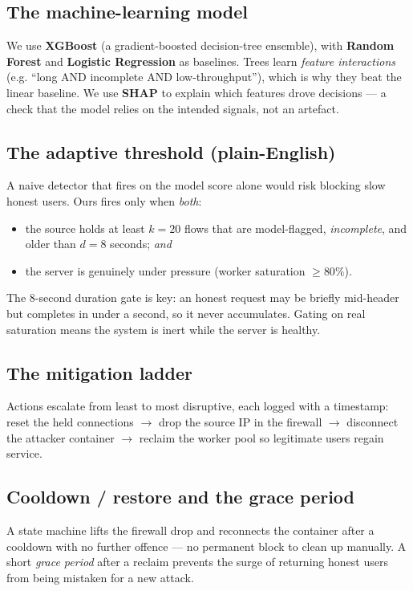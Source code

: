 \documentclass[11pt,a4paper]{article}
\newcommand{\term}[1]{\textbf{#1}}
\begin{document}
\subsection{The machine-learning model}
We use \term{XGBoost} (a gradient-boosted decision-tree ensemble), with
\term{Random Forest} and \term{Logistic Regression} as baselines. Trees learn
\emph{feature interactions} (e.g. ``long AND incomplete AND low-throughput''),
which is why they beat the linear baseline. We use \term{SHAP} to explain which
features drove decisions --- a check that the model relies on the intended signals,
not an artefact.

\subsection{The adaptive threshold (plain-English)}
A naive detector that fires on the model score alone would risk blocking slow
honest users. Ours fires only when \emph{both}:
\begin{itemize}
  \item the source holds at least $k=20$ flows that are model-flagged,
  \emph{incomplete}, and older than $d=8$ seconds; \emph{and}
  \item the server is genuinely under pressure (worker saturation
  $\geq 80\%$).
\end{itemize}
The 8-second duration gate is key: an honest request may be briefly mid-header but
completes in under a second, so it never accumulates. Gating on real saturation
means the system is inert while the server is healthy.

\subsection{The mitigation ladder}
Actions escalate from least to most disruptive, each logged with a timestamp:
reset the held connections $\rightarrow$ drop the source IP in the firewall
$\rightarrow$ disconnect the attacker container $\rightarrow$ reclaim the worker
pool so legitimate users regain service.

\subsection{Cooldown / restore and the grace period}
A state machine lifts the firewall drop and reconnects the container after a
cooldown with no further offence --- no permanent block to clean up manually. A
short \emph{grace period} after a reclaim prevents the surge of returning honest
users from being mistaken for a new attack.
\end{document}
